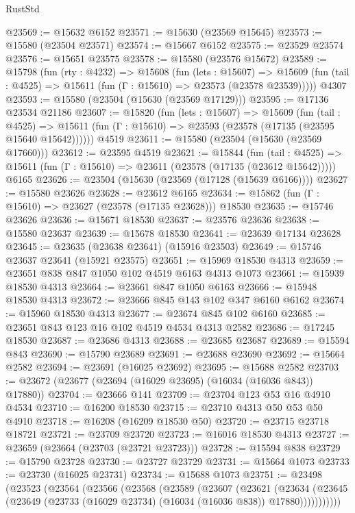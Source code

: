 \begin{lexlean}{RustStd}
\begin{coremodule}
@23569 := @15632 @6152
@23571 := @15630 (@23569 @15645)
@23573 := @15580 (@23504 @23571)
@23574 := @15667 @6152
@23575 := @23529 @23574
@23576 := @15651 @23575
@23578 := @15580 (@23576 @15672)
@23589 := @15798
    (fun (rty : @4232) =>
    @15608
      (fun (lets : @15607) =>
      @15609 (fun (tail : @4525) => @15611 (fun (Γ : @15610) => @23573 (@23578 @23539)))))
    @4307
@23593 := @15580 (@23504 (@15630 (@23569 @17129)))
@23595 := @17136 @23534 @21186
@23607 := @15820
    (fun (lets : @15607) =>
    @15609
      (fun (tail : @4525) =>
      @15611 (fun (Γ : @15610) => @23593 (@23578 (@17135 (@23595 @15640 @15642))))))
    @4519
@23611 := @15580 (@23504 (@15630 (@23569 @17660)))
@23612 := @23595 @4519
@23621 := @15844
    (fun (tail : @4525) => @15611 (fun (Γ : @15610) => @23611 (@23578 (@17135 (@23612 @15642)))))
    @6165
@23626 := @23504 (@15630 (@23569 (@17128 (@15639 @6166))))
@23627 := @15580 @23626
@23628 := @23612 @6165
@23634 := @15862 (fun (Γ : @15610) => @23627 (@23578 (@17135 @23628))) @18530
@23635 := @15746 @23626
@23636 := @15671 @18530
@23637 := @23576 @23636
@23638 := @15580 @23637
@23639 := @15678 @18530
@23641 := @23639 @17134 @23628
@23645 := @23635 (@23638 @23641) (@15916 @23503)
@23649 := @15746 @23637 @23641 (@15921 @23575)
@23651 := @15969 @18530 @4313
@23659 := @23651 @838 @847 @1050 @102 @4519 @6163 @4313 @1073
@23661 := @15939 @18530 @4313
@23664 := @23661 @847 @1050 @6163
@23666 := @15948 @18530 @4313
@23672 := @23666 @845 @143 @102 @347 @6160 @6162
@23674 := @15960 @18530 @4313
@23677 := @23674 @845 @102 @6160
@23685 := @23651 @843 @123 @16 @102 @4519 @4534 @4313 @2582
@23686 := @17245 @18530
@23687 := @23686 @4313
@23688 := @23685 @23687
@23689 := @15594 @843
@23690 := @15790 @23689
@23691 := @23688 @23690
@23692 := @15664 @2582
@23694 := @23691 (@16025 @23692)
@23695 := @15688 @2582
@23703 := @23672 (@23677 (@23694 (@16029 @23695) (@16034 (@16036 @843)) @17880))
@23704 := @23666 @141
@23709 := @23704 @123 @53 @16 @4910 @4534
@23710 := @16200 @18530
@23715 := @23710 @4313 @50 @53 @50 @4910
@23718 := @16208 (@16209 @18530 @50)
@23720 := @23715 @23718 @18721
@23721 := @23709 @23720
@23723 := @16016 @18530 @4313
@23727 := @23659 (@23664 (@23703 (@23721 @23723)))
@23728 := @15594 @838
@23729 := @15790 @23728
@23730 := @23727 @23729
@23731 := @15664 @1073
@23733 := @23730 (@16025 @23731)
@23734 := @15688 @1073
@23751 := @23498
    (@23523
      (@23564
        (@23566
          (@23568
            (@23589
              (@23607
                (@23621
                  (@23634
                    (@23645 (@23649 (@23733 (@16029 @23734) (@16034 (@16036 @838)) @17880)))))))))))

\end{coremodule}
\end{lexlean}
